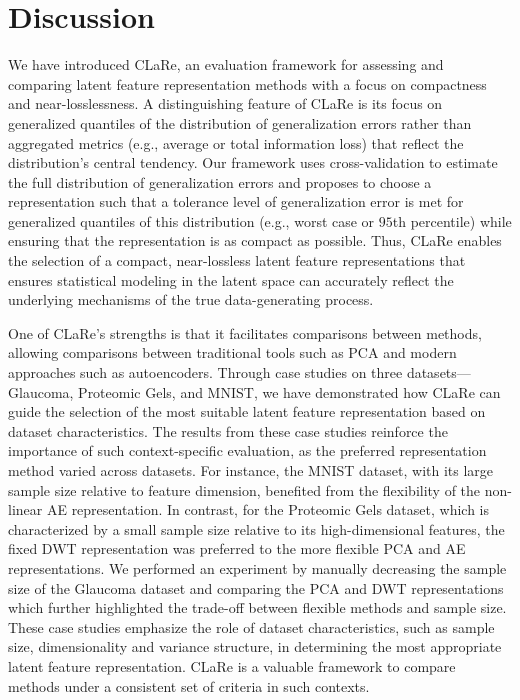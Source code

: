 \section{Discussion}\label{sec:discussion}

We have introduced CLaRe, an evaluation framework for assessing and comparing latent feature representation methods with a focus on compactness and near-losslessness.
A distinguishing feature of CLaRe is its focus on generalized quantiles of the distribution of generalization errors rather than aggregated metrics (e.g., average or total information loss) that reflect the distribution's central tendency.
Our framework uses cross-validation to estimate the full distribution of generalization errors and proposes to choose a representation such that a tolerance level of generalization error is met for generalized quantiles of this distribution (e.g., worst case or $95$th percentile) while ensuring that the representation is as compact as possible.
Thus, CLaRe enables the selection of a compact, near-lossless latent feature representations that ensures statistical modeling in the latent space can accurately reflect the underlying mechanisms of the true data-generating process.




One of CLaRe's strengths is that it facilitates comparisons between methods, allowing comparisons between traditional tools such as PCA and modern approaches such as autoencoders. 
Through case studies on three datasets—Glaucoma, Proteomic Gels, and MNIST, we have demonstrated how CLaRe can guide the selection of the most suitable latent feature representation based on dataset characteristics.
The results from these case studies reinforce the importance of such context-specific evaluation, as the preferred representation method varied across datasets. 
For instance, the MNIST dataset, with its large sample size relative to feature dimension, benefited from the flexibility of the non-linear AE representation. 
In contrast, for the Proteomic Gels dataset, which is characterized by a small sample size relative to its high-dimensional features, the fixed DWT representation was preferred to the more flexible PCA and AE representations.
We performed an experiment by manually decreasing the sample size of the Glaucoma dataset and comparing the PCA and DWT representations which further highlighted the trade-off between flexible methods and sample size.
These case studies emphasize the role of dataset characteristics, such as sample size, dimensionality and variance structure, in determining the most appropriate latent feature representation. 
CLaRe is a valuable framework to compare methods under a consistent set of criteria in such contexts.

